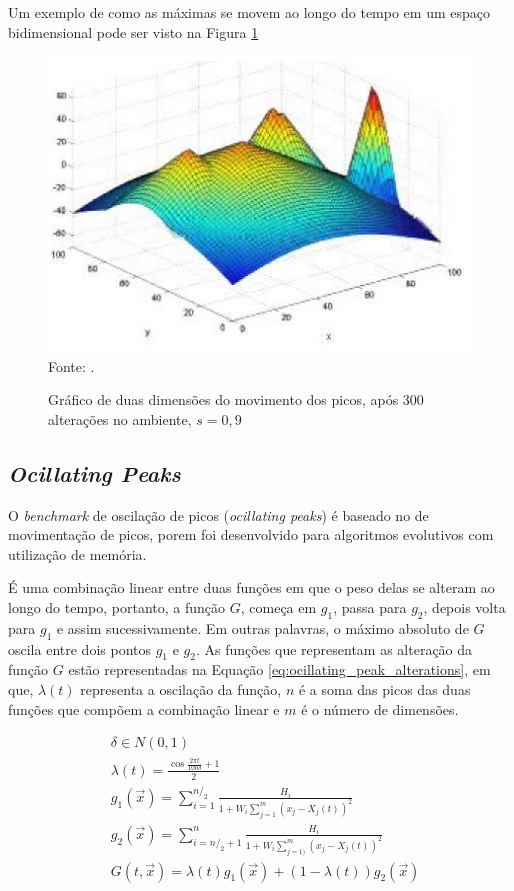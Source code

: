 Um exemplo de como as máximas se movem ao longo do tempo em um espaço bidimensional pode ser visto na Figura \ref{fig:moving_peaks}

\begin{figure}[!htb]
	\caption{Gráfico de duas dimensões do movimento dos picos, após 300 alterações no ambiente, $ s = 0,9 $}
	\centering
	\includegraphics[scale=0.5]{images/moving_peak.png}
	\label{fig:moving_peaks}{\\Fonte: .}
\end{figure}

\subsection{\textit{Ocillating Peaks}}

O \textit{benchmark} de oscilação de picos (\textit{ocillating peaks}) é baseado no de movimentação de picos, porem foi desenvolvido para algoritmos evolutivos com utilização de memória.

É uma combinação linear entre duas funções em que o peso delas se alteram ao longo do tempo, portanto, a função $G$, começa em $g_1$, passa para $g_2$, depois volta para $g_1$ e assim sucessivamente. Em outras palavras, o máximo absoluto de $G$ oscila entre dois pontos $g_1$ e $g_2$. As funções que representam as alteração da função $G$ estão representadas na Equação \ref{eq:ocillating_peak_alterations}, em que, $\lambda (t)$ representa a oscilação da função, $n$ é a soma das picos das duas funções que compõem a combinação linear e $m$ é o número de dimensões.

\begin{equation}
\label{eq:ocillating_peak_alterations}
\begin{split}
& \delta \in N(0,1) \\
& \lambda (t) = \frac{\cos{\frac{2\pi t}{100\delta}} +1}{2} \\
& g_1(\vec{x}) = \sum_{i=1}^{n/_2} \frac{H_i}{1+W_i \sum_{j=1}^{m} (x_j - X_j(t))^2} \\
& g_2(\vec{x}) = \sum_{i=n/_2+1}^{n} \frac{H_i}{1+W_i \sum_{j=1)}^{m} (x_j - X_j(t))^2} \\
& G(t,\vec{x}) = \lambda (t) g_1(\vec{x}) + (1-\lambda (t))g_2(\vec{x})
\end{split}
\end{equation}